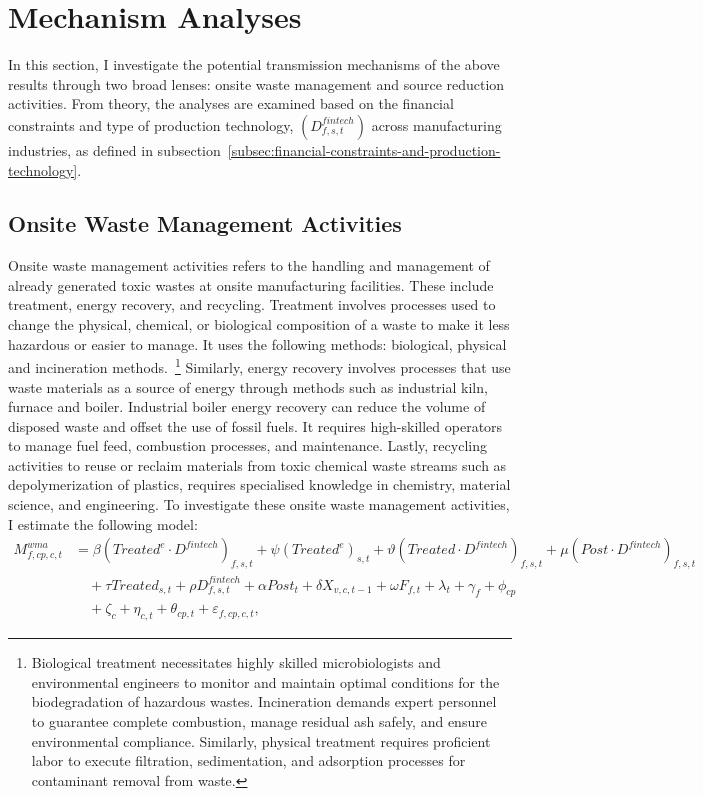\documentclass[12pt, english]{article}
\begin{document}
    \section{Mechanism Analyses}\label{sec:mechanism-analyses}
    In this section, I investigate the potential transmission mechanisms of the above results through two broad lenses: onsite waste management and source reduction activities. From theory, the analyses are examined based on the financial constraints and type of production technology, $(D^{fintech}_{f,s,t})$ across manufacturing industries, as defined in subsection~\ref{subsec:financial-constraints-and-production-technology}.

    \subsection{Onsite Waste Management Activities}\label{subsec:onsite-waste-management-activities}
    Onsite waste management activities refers to the handling and management of already generated toxic wastes at onsite manufacturing facilities. These include treatment, energy recovery, and recycling. Treatment involves processes used to change the physical, chemical, or biological composition of a waste to make it less hazardous or easier to manage. It uses the following methods: biological, physical and incineration methods.~\footnote{\tiny Biological treatment necessitates highly skilled microbiologists and environmental engineers to monitor and maintain optimal conditions for the biodegradation of hazardous wastes. Incineration demands expert personnel to guarantee complete combustion, manage residual ash safely, and ensure environmental compliance. Similarly, physical treatment requires proficient labor to execute filtration, sedimentation, and adsorption processes for contaminant removal from waste.} Similarly, energy recovery involves processes that use waste materials as a source of energy through methods such as industrial kiln, furnace and boiler. Industrial boiler energy recovery can reduce the volume of disposed waste and offset the use of fossil fuels. It requires high-skilled operators to manage fuel feed, combustion processes, and maintenance. Lastly, recycling activities to reuse or reclaim materials from toxic chemical waste streams such as depolymerization of plastics, requires specialised knowledge in chemistry, material science, and engineering. To investigate these onsite waste management activities, I estimate the following model:
    \begin{align}
        M_{f,cp,c,t}^{wma} &= \beta (Treated^{e} \cdot D^{fintech})_{f,s,t} + \psi (Treated^{e})_{s,t} + \vartheta (Treated \cdot D^{fintech})_{f,s,t} + \mu (Post \cdot D^{fintech})_{f,s,t} \nonumber \\
        &\quad + \tau Treated_{s,t} + \rho D_{f,s,t}^{fintech} + \alpha Post_{t} + \delta X_{v,c,t-1} + \omega F_{f,t} + \lambda_{t} + \gamma_{f} + \phi_{cp} \nonumber \\
        &\quad + \zeta_{c} + \eta_{c,t} + \theta_{cp,t} + \varepsilon_{f,cp,c,t},\label{eq:mechanisms-waste-management}
    \end{align}
\end{document}
